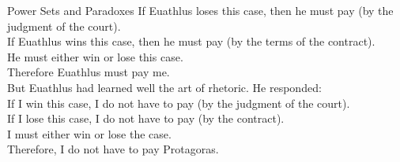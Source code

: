 \begin{section}{Power Sets and Paradoxes}
\noindent If Euathlus loses this case, then he must pay (by the judgment of the court).\\
If Euathlus wins this case, then he must pay (by the terms of the contract).\\
He must either win or lose this case.\\
Therefore Euathlus must pay me.\\

\noindent But Euathlus had learned well the art of rhetoric. He responded:\\

\noindent If I win this case, I do not have to pay (by the judgment of the court).\\
If I lose this case, I do not have to pay (by the contract).\\
I must either win or lose the case.\\
Therefore, I do not have to pay Protagoras.

\end{section}
